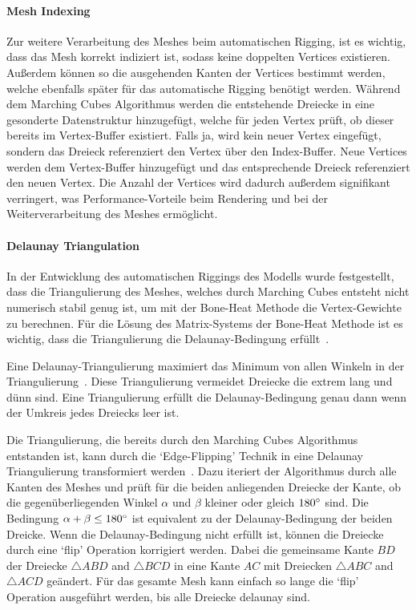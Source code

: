 \paragraph{Mesh Indexing}
Zur weitere Verarbeitung des Meshes beim automatischen Rigging, ist es wichtig, dass das Mesh korrekt indiziert ist, sodass keine doppelten Vertices existieren. Außerdem können so die ausgehenden Kanten der Vertices bestimmt werden, welche ebenfalls später für das automatische Rigging benötigt werden. Während dem Marching Cubes Algorithmus werden die entstehende Dreiecke in eine gesonderte Datenstruktur hinzugefügt, welche für jeden Vertex prüft, ob dieser bereits im Vertex-Buffer existiert. Falls ja, wird kein neuer Vertex eingefügt, sondern das Dreieck referenziert den Vertex über den Index-Buffer. Neue Vertices werden dem Vertex-Buffer hinzugefügt und das entsprechende Dreieck referenziert den neuen Vertex. Die Anzahl der Vertices wird dadurch außerdem signifikant verringert, was Performance-Vorteile beim Rendering und bei der Weiterverarbeitung des Meshes ermöglicht.

\paragraph{Delaunay Triangulation}
In der Entwicklung des automatischen Riggings des Modells wurde festgestellt, dass die Triangulierung des Meshes, welches durch Marching Cubes entsteht nicht numerisch stabil genug ist, um mit der Bone-Heat Methode die Vertex-Gewichte zu berechnen. Für die Lösung des Matrix-Systems der Bone-Heat Methode ist es wichtig, dass die Triangulierung die Delaunay-Bedingung erfüllt~\cite{laplace_beltrami_paper}.

Eine Delaunay-Triangulierung maximiert das Minimum von allen Winkeln in der Triangulierung~\cite{delaunay}. Diese Triangulierung vermeidet Dreiecke die extrem lang und dünn sind. Eine Triangulierung erfüllt die Delaunay-Bedingung genau dann wenn der Umkreis jedes Dreiecks leer ist.

Die Triangulierung, die bereits durch den Marching Cubes Algorithmus entstanden ist, kann durch die `Edge-Flipping' Technik in eine Delaunay Triangulierung transformiert werden~\cite{delaunay}. Dazu iteriert der Algorithmus durch alle Kanten des Meshes und prüft für die beiden anliegenden Dreiecke der Kante, ob die gegenüberliegenden Winkel $\alpha$ und $\beta$ kleiner oder gleich $180\degree$ sind. Die Bedingung $\alpha+\beta \leq 180\degree$ ist equivalent zu der Delaunay-Bedingung der beiden Dreicke. Wenn die Delaunay-Bedingung nicht erfüllt ist, können die Dreiecke durch eine `flip' Operation korrigiert werden. Dabei die gemeinsame Kante $BD$ der Dreiecke $\triangle ABD$ and $\triangle BCD$ in eine Kante $AC$ mit Dreiecken $\triangle ABC$ and $\triangle ACD$ geändert. Für das gesamte Mesh kann einfach so lange die `flip' Operation ausgeführt werden, bis alle Dreiecke delaunay sind.

